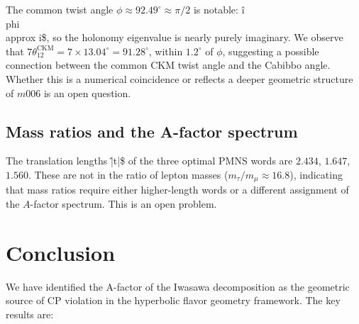 \documentclass[floatfix,aps,prd,twocolumn,showpacs,superscriptaddress,longbibliography]{revtex4-2}
\begin{document}
The common twist angle $\phi \approx 92.49^\circ \approx \pi/2$
is notable: \^{i\\phi} \\approx i\$, so the holonomy eigenvalue
is nearly purely imaginary. We observe that
$7\theta_{12}^{\mathrm{CKM}} = 7 \times 13.04^\circ = 91.28^\circ$,
within $1.2^\circ$ of $\phi$, suggesting a possible connection
between the common CKM twist angle and the Cabibbo angle.
Whether this is a numerical coincidence or reflects a deeper
geometric structure of $m006$ is an open question.

\subsection{Mass ratios and the A-factor spectrum}

The translation lengths \^{|t|}\$ of the three optimal PMNS words
are $2.434$, $1.647$, $1.560$. These are not in the ratio of
lepton masses ($m_\tau/m_\mu \approx 16.8$), indicating that
mass ratios require either higher-length words or a different
assignment of the $A$-factor spectrum. This is an open problem.

\section{Conclusion}
\label{sec:conclusion}

We have identified the A-factor of the Iwasawa decomposition as
the geometric source of CP violation in the hyperbolic flavor
geometry framework. The key results are:
\end{document}
